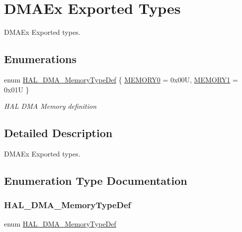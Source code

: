 \hypertarget{group___d_m_a_ex___exported___types}{}\section{D\+M\+A\+Ex Exported Types}
\label{group___d_m_a_ex___exported___types}


D\+M\+A\+Ex Exported types.  


\subsection*{Enumerations}
\begin{DoxyCompactItemize}
\item 
enum \mbox{\hyperlink{group___d_m_a_ex___exported___types_ga9cec283a461e47eda968838c35fd6eed}{H\+A\+L\+\_\+\+D\+M\+A\+\_\+\+Memory\+Type\+Def}} \{ \mbox{\hyperlink{group___d_m_a_ex___exported___types_gga9cec283a461e47eda968838c35fd6eeda2dec05a318eee29371114f1a8f6fe3f4}{M\+E\+M\+O\+R\+Y0}} = 0x00U, 
\mbox{\hyperlink{group___d_m_a_ex___exported___types_gga9cec283a461e47eda968838c35fd6eeda06080dfa68716b5bbf425d9232b144c3}{M\+E\+M\+O\+R\+Y1}} = 0x01U
 \}
\begin{DoxyCompactList}\small\item\em H\+AL D\+MA Memory definition ~\newline
 \end{DoxyCompactList}\end{DoxyCompactItemize}


\subsection{Detailed Description}
D\+M\+A\+Ex Exported types. 



\subsection{Enumeration Type Documentation}
\mbox{\label{group___d_m_a_ex___exported___types_ga9cec283a461e47eda968838c35fd6eed}} 
\subsubsection{\texorpdfstring{H\+A\+L\+\_\+\+D\+M\+A\+\_\+\+Memory\+Type\+Def}{HAL\_DMA\_MemoryTypeDef}}
{\footnotesize\ttfamily enum \mbox{\hyperlink{group___d_m_a_ex___exported___types_ga9cec283a461e47eda968838c35fd6eed}{H\+A\+L\+\_\+\+D\+M\+A\+\_\+\+Memory\+Type\+Def}}}




